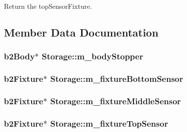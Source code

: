 Return the top\-Sensor\-Fixture. 



\subsection{Member Data Documentation}
\hypertarget{classStorage_a3bae1d833350258742b94caca470e735}{
\subsubsection[{m\-\_\-body\-Stopper}]{\setlength{\rightskip}{0pt plus 5cm}b2\-Body$\ast$ Storage\-::m\-\_\-body\-Stopper}}\label{classStorage_a3bae1d833350258742b94caca470e735}
\hypertarget{classStorage_afa76f1b21a27a64ef14d2360cc518bc3}{
\subsubsection[{m\-\_\-fixture\-Bottom\-Sensor}]{\setlength{\rightskip}{0pt plus 5cm}b2\-Fixture$\ast$ Storage\-::m\-\_\-fixture\-Bottom\-Sensor}}\label{classStorage_afa76f1b21a27a64ef14d2360cc518bc3}
\hypertarget{classStorage_a27bcc4c94a7766c56f98ace7e2c3b662}{
\subsubsection[{m\-\_\-fixture\-Middle\-Sensor}]{\setlength{\rightskip}{0pt plus 5cm}b2\-Fixture$\ast$ Storage\-::m\-\_\-fixture\-Middle\-Sensor}}\label{classStorage_a27bcc4c94a7766c56f98ace7e2c3b662}
\hypertarget{classStorage_afa862f61854f0960b41ae24b673b3980}{
\subsubsection[{m\-\_\-fixture\-Top\-Sensor}]{\setlength{\rightskip}{0pt plus 5cm}b2\-Fixture$\ast$ Storage\-::m\-\_\-fixture\-Top\-Sensor}}\label{classStorage_afa862f61854f0960b41ae24b673b3980}
